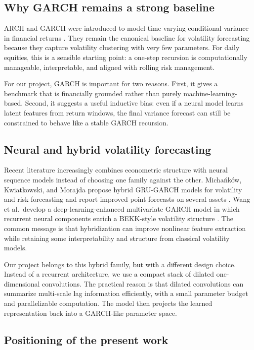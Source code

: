 \documentclass[11pt,a4paper]{article}
\begin{document}
\subsection{Why GARCH remains a strong baseline}

ARCH and GARCH were introduced to model time-varying conditional variance in financial returns \cite{engle1982,bollerslev1986}. They remain the canonical baseline for volatility forecasting because they capture volatility clustering with very few parameters. For daily equities, this is a sensible starting point: a one-step recursion is computationally manageable, interpretable, and aligned with rolling risk management.

For our project, GARCH is important for two reasons. First, it gives a benchmark that is financially grounded rather than purely machine-learning-based. Second, it suggests a useful inductive bias: even if a neural model learns latent features from return windows, the final variance forecast can still be constrained to behave like a stable GARCH recursion.

\subsection{Neural and hybrid volatility forecasting}

Recent literature increasingly combines econometric structure with neural sequence models instead of choosing one family against the other. Micha\'nk\'ow, Kwiatkowski, and Morajda propose hybrid GRU-GARCH models for volatility and risk forecasting and report improved point forecasts on several assets \cite{michankow2023}. Wang et al.\ develop a deep-learning-enhanced multivariate GARCH model in which recurrent neural components enrich a BEKK-style volatility structure \cite{wang2025}. The common message is that hybridization can improve nonlinear feature extraction while retaining some interpretability and structure from classical volatility models.

Our project belongs to this hybrid family, but with a different design choice. Instead of a recurrent architecture, we use a compact stack of dilated one-dimensional convolutions. The practical reason is that dilated convolutions can summarize multi-scale lag information efficiently, with a small parameter budget and parallelizable computation. The model then projects the learned representation back into a GARCH-like parameter space.

\subsection{Positioning of the present work}
\end{document}
